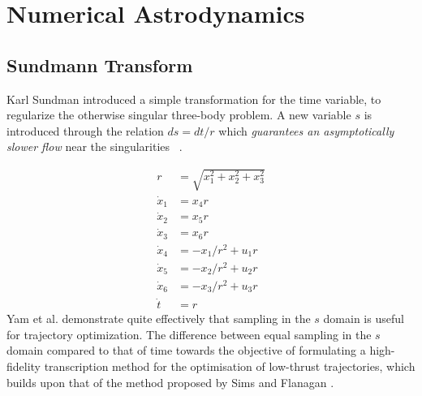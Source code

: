 \section{Numerical Astrodynamics}\label{sec:numerical_astrodynamics}


\subsection{Sundmann Transform}\label{ssec:sundmann_transform}

Karl Sundman introduced a simple transformation for the time variable, to
regularize the otherwise singular three-body problem. A new variable $s$ is
introduced through the relation $ds=dt/r$ which \textit{guarantees an
    asymptotically slower flow} near the singularities ~\cite{Sundman1913}.

\begin{equation}
    \begin{aligned}
        r         & =\sqrt{x_1 ^2 + x_2 ^ 2 + x_3 ^ 2} \\
        \dot{x}_1 & = x_{4}r                           \\
        \dot{x}_2 & = x_{5}r                           \\
        \dot{x}_3 & = x_{6}r                           \\
        \dot{x}_4 & = -x_{1}/r^2+u_1{r}                \\
        \dot{x}_5 & = -x_{2}/r^2+u_2{r}                \\
        \dot{x}_6 & = -x_{3}/r^2+u_3{r}                \\
        \dot{t}   & = r
    \end{aligned}
\end{equation}
Yam et al. demonstrate quite effectively that sampling in the $s$ domain is useful for trajectory optimization. \cite{Yam2010} The difference between equal sampling in the $s$ domain compared to that of time towards the objective of formulating a high-fidelity transcription method for the optimisation of low-thrust trajectories, which builds upon that of the method proposed by Sims and Flanagan \cites{Sims1999}.

